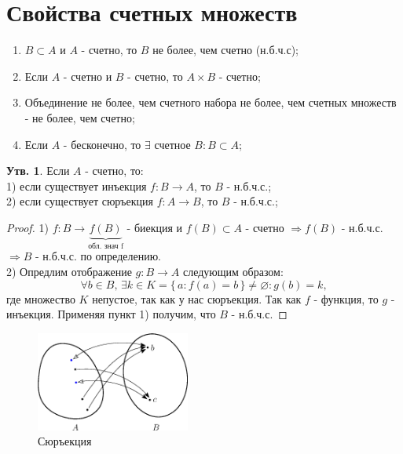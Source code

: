 \documentclass[12pt]{article}
\theoremstyle{definition}
\newtheorem{prop}{Утв.}
\begin{document}
	
\section*{Свойства счетных множеств}
\begin{enumerate}[label={(\arabic*)}]
	\item $B \subset A$ и $A$ - счетно, то $B$ не более, чем счетно (н.б.ч.с);
	\item Если $A$ - счетно и $B$ - счетно, то $A\times B$ - счетно;
	\item Объединение не более, чем счетного набора не более, чем счетных множеств - не более, чем счетно;
	\item Если $A$ - бесконечно, то $\exists$ счетное $B \colon B \subset A$;
\end{enumerate}

\begin{prop}
Если $A$ - счетно, то:\\
	1) если существует инъекция $f \colon B \rightarrow A$, то $B$ - н.б.ч.с.;\\
	2) если существует сюръекция $f \colon A \rightarrow B$, то $B$ - н.б.ч.с.;
\end{prop}

\begin{proof}
	1) $f \colon B \rightarrow \underbrace{f(B)}_\text{обл. знач f}$ - биекция и $f(B) \subset A$ - счетно $\Rightarrow f(B)$ - н.б.ч.с. $\Rightarrow B$ - н.б.ч.с. по определению.\\
	2) Опредлим отображение $g \colon B \rightarrow A$ следующим образом:\\ 
	$$\forall b \in B,\, \exists k \in K = \{\,a \colon f(a) = b \,\} \neq \varnothing \colon g(b) = k,$$ где множество $K$ непустое, так как у нас сюръекция. Так как $f$ - функция, то $g$ - инъекция. Применяя пункт 1) получим, что $B$ - н.б.ч.с.
\end{proof}
\begin{figure}[H]
	\centering
	\includegraphics[width=0.45\textwidth]{5_1.eps}
	\caption{Сюръекция}
	\label{5_1}
\end{figure}
\end{document}
